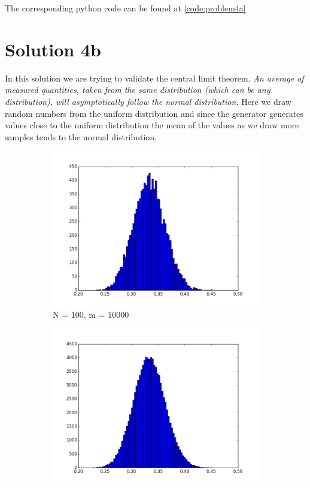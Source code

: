 \documentclass[a4paper,11pt]{article}
\begin{document}
The corresponding python code can be found at \ref{code:problem4a}

\section{Solution 4b}\label{prob4b}
In this solution we are trying to validate the central limit theorem. \textit{An average of measured quantities, taken from the same distribution (which can be any distribution), will asymptotically follow the normal distribution.}
Here we draw random numbers from the uniform distribution and since the generator generates values close to the uniform distribution the mean of the values as we draw more samples tends to the normal distribution.
\begin{figure}[ht]
    \begin{subfigure}{.5 \textwidth}
	\centering
    \includegraphics[scale=0.45]{fig4b.png}
    \caption{N = 100, m = 10000}
	\label{fig:clt_10000}
    \end{subfigure}
    \begin{subfigure}{.5 \textwidth}
	\centering
    \includegraphics[scale=0.45]{fig4b_100000.png}

\end{subfigure}
\end{figure}
\end{document}
